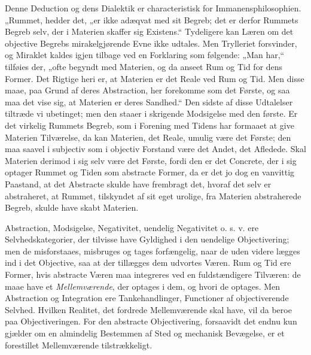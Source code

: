 \documentclass[12pt,a4paper]{book}
\begin{document}
Denne Deduction og dens Dialektik er characteristisk for
Immanensphilosophien. „Rummet, hedder det, „er ikke adæqvat med sit
Begreb; det er derfor Rummets Begreb selv, der i Materien skaffer sig
Existens.“ Tydeligere kan Læren om det objective Begrebs
mirakelgjørende Evne ikke udtales. Men Trylleriet forsvinder, og
Miraklet kaldes igjen tilbage ved en Forklaring som følgende: „Man
har,“ tilføies der, „ofte begyndt med Materien, og da anseet Rum og Tid
for dens Former. Det Rigtige heri er, at Materien er det Reale ved Rum
og Tid. Men disse maae, paa Grund af deres Abstraction, her forekomme
som det Første, og saa maa det vise sig, at Materien er deres
Sandhed.“ Den sidste af disse Udtalelser tiltræde vi ubetinget; men
den staaer i skrigende Modsigelse med den første. Er det virkelig
Rummets Begreb, som i Forening med Tidens har formaaet at give Materien
Tilværelse, da kan Materien, det Reale, umulig være det Første; den maa
saavel i subjectiv som i objectiv Forstand være det Andet, det
Afledede. Skal Materien derimod i sig selv være det Første, fordi den
er det Concrete, der i sig optager Rummet og Tiden som abstracte
Former, da er det jo dog en vanvittig Paastand, at det Abstracte skulde
have frembragt det, hvoraf det selv er abstraheret, at Rummet,
tilskyndet af sit eget urolige, fra Materien abstraherede Begreb,
skulde have skabt Materien.

Abstraction, Modsigelse, Negativitet, uendelig Negativitet o. s. v.
ere Selvhedskategorier, der tilvisse have Gyldighed i den uendelige
Objectivering; men de misforstaaes, misbruges og tages forfængelig,
naar de uden videre lægges ind i det Objective, saa at der tillægges
dem udvortes Væren. Rum og Tid ere Former, hvis abstracte Væren maa
integreres ved en fuldstændigere Tilværen: de maae have et
\emph{Mellemværende}, der optages i dem, og hvori de optages. Men
Abstraction og Integration ere Tankehandlinger, Functioner af
objectiverende Selvhed. Hvilken Realitet, det
fordrede Mellemværende skal have, vil da beroe paa Objectiveringen.
For den abstracte Objectivering, forsaavidt det endnu kun gjælder om en
almindelig Bestemmen af Sted og mechanisk Bevægelse, er et forestillet
Mellemværende tilstrækkeligt.
\end{document}
